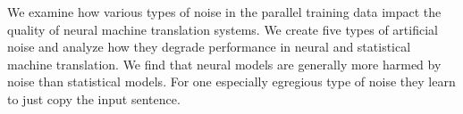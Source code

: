 We examine how various types of noise in the parallel training data impact the quality of neural machine translation systems. We create five types of artificial noise and analyze how they degrade performance in neural and statistical machine translation. We find that neural models are generally more harmed by noise than statistical models. For one especially egregious type of noise they learn to just copy the input sentence.
